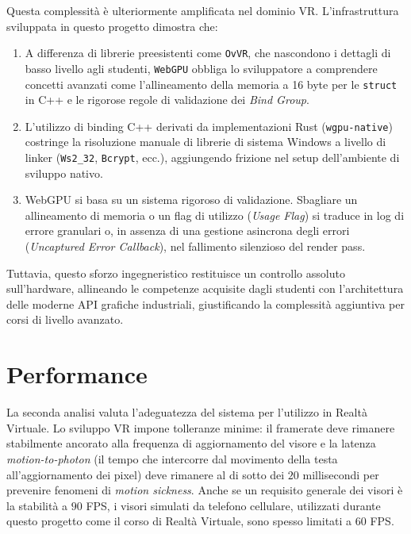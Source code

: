\documentclass[a4paper, 11pt, twoside]{report}
\begin{document}
Questa complessità è ulteriormente amplificata nel dominio VR. L'infrastruttura sviluppata in questo progetto dimostra
che:
\begin{enumerate}
    \item A differenza di librerie preesistenti come \texttt{OvVR}, che nascondono i dettagli di basso livello agli
        studenti, \texttt{WebGPU} obbliga lo sviluppatore a comprendere concetti avanzati come l'allineamento della
        memoria a 16 byte per le \texttt{struct} in C++ e le rigorose regole di validazione dei \textit{Bind Group}.
    \item L'utilizzo di binding C++ derivati da implementazioni Rust (\texttt{wgpu-native}) costringe la risoluzione
        manuale di librerie di sistema Windows a livello di linker (\texttt{Ws2\_32}, \texttt{Bcrypt}, ecc.),
        aggiungendo frizione nel setup dell'ambiente di sviluppo nativo.
    \item WebGPU si basa su un sistema rigoroso di validazione. Sbagliare un allineamento di memoria o un flag di
        utilizzo (\textit{Usage Flag}) si traduce in log di errore granulari o, in assenza di una gestione asincrona
        degli errori (\textit{Uncaptured Error Callback}), nel fallimento silenzioso del render pass.
\end{enumerate}

Tuttavia, questo sforzo ingegneristico restituisce un controllo assoluto sull'hardware, allineando le competenze
acquisite dagli studenti con l'architettura delle moderne API grafiche industriali, giustificando la complessità
aggiuntiva per corsi di livello avanzato.

\section{Performance}

La seconda analisi valuta l'adeguatezza del sistema per l'utilizzo in Realtà Virtuale. Lo sviluppo VR impone
tolleranze minime: il \gls{framerate} deve rimanere stabilmente ancorato alla frequenza di aggiornamento del visore e
la latenza \textit{motion-to-photon} (il tempo che intercorre dal movimento della testa all'aggiornamento dei pixel)
deve rimanere al di sotto dei $20$ millisecondi per prevenire fenomeni di \textit{motion sickness}.
Anche se un requisito generale dei visori è la stabilità a $90$ FPS, i visori simulati da telefono cellulare,
utilizzati durante questo progetto come il corso di Realtà Virtuale, sono spesso limitati a $60$ FPS.
\end{document}

